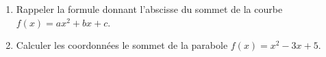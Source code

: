 
\begin{exercice}\label{exosmath-0091}

    \begin{enumerate}
        \item
            Rappeler la formule donnant l'abscisse du sommet de la courbe \( f(x)=ax^2+bx+c\).
        \item
            Calculer les coordonnées le sommet de la parabole \( f(x)=x^2-3x+5\).
    \end{enumerate}

\end{exercice}
